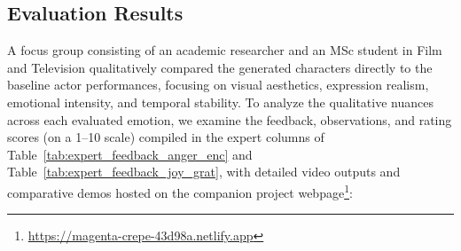 \documentclass[pdflatex,sn-mathphys-num]{sn-jnl}
\theoremstyle{thmstyleone}
\theoremstyle{thmstyletwo}
\theoremstyle{thmstylethree}
\begin{document}
\subsection{Evaluation Results}\label{subsec:qualitative_evaluation}

A focus group consisting of an academic researcher and an MSc student in Film and Television qualitatively compared the generated characters directly to the baseline actor performances, focusing on visual aesthetics, expression realism, emotional intensity, and temporal stability. To analyze the qualitative nuances across each evaluated emotion, we examine the feedback, observations, and rating scores (on a 1--10 scale) compiled in the expert columns of Table~\ref{tab:expert_feedback_anger_enc} and Table~\ref{tab:expert_feedback_joy_grat}, with detailed video outputs and comparative demos hosted on the companion project webpage\footnote{\url{https://magenta-crepe-43d98a.netlify.app}}:
\end{document}
